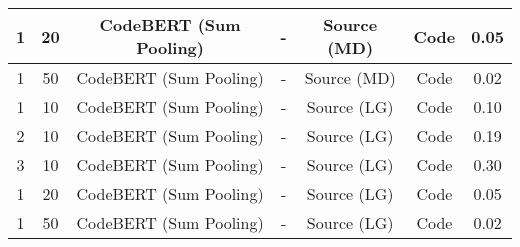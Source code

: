 \begin{longtable}{|c|c|c|c|c|c|c|}
\hline
1 & 20 & CodeBERT (Sum Pooling) & - & Source (MD) & Code & 0.05 \\
\hline
1 & 50 & CodeBERT (Sum Pooling) & - & Source (MD) & Code & 0.02 \\
\hline
1 & 10 & CodeBERT (Sum Pooling) & - & Source (LG) & Code & 0.10 \\
\hline
2 & 10 & CodeBERT (Sum Pooling) & - & Source (LG) & Code & 0.19 \\
\hline
3 & 10 & CodeBERT (Sum Pooling) & - & Source (LG) & Code & 0.30 \\
\hline
1 & 20 & CodeBERT (Sum Pooling) & - & Source (LG) & Code & 0.05 \\
\hline
1 & 50 & CodeBERT (Sum Pooling) & - & Source (LG) & Code & 0.02 \\
\hline
\end{longtable}

